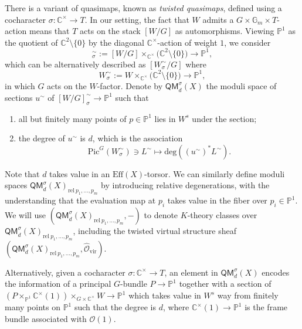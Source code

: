 \documentclass[reqno]{amsart}
\numberwithin{equation}{section}
\numberwithin{equation}{section}
\numberwithin{equation}{section}
\theoremstyle{definition}
\theoremstyle{remark}
\theoremstyle{remark}
\begin{document}
There is a variant of quasimaps, known as \emph{twisted quasimaps}, defined using a cocharacter $\sigma: \mathbb{C}^{\times} \to T$. In our setting, the fact that $W$ admits a $G \times \mathbb{G}_m \times T$-action means that $T$ acts on the stack $[W/G]$ as automorphisms. Viewing $\mathbb{P}^1$ as the quotient of $\mathbb{C}^2 \setminus \{0\}$ by the diagonal $\mathbb{C}^{\times}$-action of weight $1$, we consider 
\begin{equation}
    [W/G]^{\sim}_{\sigma} := [W/G] \times_{\mathbb{C}^{\times}} \big( \mathbb{C}^2 \setminus \{0\} \big) \to \mathbb{P}^1,
\end{equation}
which can be alternatively described as $[W^{\sim}_{\sigma} / G]$ where
\begin{equation}
    W^{\sim}_{\sigma} := W \times_{\mathbb{C}^{\times}} \big( \mathbb{C}^2 \setminus \{0\} \big) \to \mathbb{P}^1,
\end{equation}
in which $G$ acts on the $W$-factor. Denote by $\mathsf{QM}^{\sigma}_d(X)$ the moduli space of sections $u^{\sim}$ of $[W/G]^{\sim}_{\sigma} \to \mathbb{P}^1$ such that 
\begin{enumerate}
    \item all but finitely many points of $p \in \mathbb{P}^1$ lies in $W^s$ under the section;
    \item the degree of $u^{\sim}$ is $d$, which is the association 
    \begin{equation}
        \mathrm{Pic}^G(W_{\sigma}^{\sim}) \ni L^{\sim} \mapsto \mathrm{deg}((u^{\sim})^* L^{\sim}).
    \end{equation}
\end{enumerate}
Note that $d$ takes value in an $\mathrm{Eff}(X)$-torsor. We can similarly define moduli spaces $\mathsf{QM}^{\sigma}_d(X)_{\mathrm{rel} \  p_1,\dots, p_m}$ by introducing relative degenerations, with the understanding that the evaluation map at $p_i$ takes value in the fiber over $p_i \in \mathbb{P}^1$. We will use $(\mathsf{QM}^{\sigma}_d(X)_{\mathrm{rel} \  p_1,\dots, p_m}, -)$ to denote $K$-theory classes over $\mathsf{QM}^{\sigma}_d(X)_{\mathrm{rel} \  p_1,\dots, p_m}$, including the twisted virtual structure sheaf $(\mathsf{QM}^{\sigma}_d(X)_{\mathrm{rel} \  p_1,\dots, p_m}, \hat{\mathcal{O}}_{\mathrm{vir}})$.

Alternatively, given a cocharacter $\sigma: \mathbb{C}^{\times} \to T$, an element in $\mathsf{QM}^{\sigma}_d(X)$ encodes the information of a principal $G$-bundle $P \to \mathbb{P}^1$ together with a section of $(P \times_{\mathbb{P}^1} \mathbb{C}^{\times}(1)) \times_{G \times \mathbb{C}^{\times}} W \to \mathbb{P}^1$ which takes value in $W^s$ way from finitely many points on $\mathbb{P}^1$ such that the degree is $d$, where $\mathbb{C}^{\times}(1) \to \mathbb{P}^1$ is the frame bundle associated with $\mathcal{O}(1)$.
\end{document}
